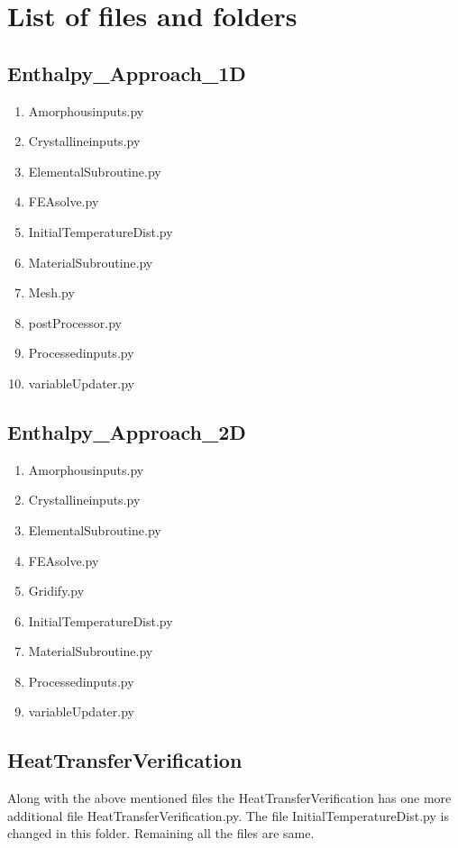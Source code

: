 \section{List of files and folders}
\subsection{Enthalpy\_Approach\_1D}
\begin{enumerate}
    \item Amorphous\textunderscore inputs.py
    \item Crystalline\textunderscore inputs.py
    \item Elemental\textunderscore Subroutine.py
    \item FEA\textunderscore solve.py
    \item Initial\textunderscore Temperature\textunderscore Dist.py
    \item Material\textunderscore Subroutine.py
    \item Mesh.py
    \item postProcessor.py
    \item Processed\textunderscore inputs.py
    \item variableUpdater.py
\end{enumerate}
\subsection{Enthalpy\_Approach\_2D}
\begin{enumerate}
    \item Amorphous\textunderscore inputs.py
    \item Crystalline\textunderscore inputs.py
    \item Elemental\textunderscore Subroutine.py
    \item FEA\textunderscore solve.py
    \item Gridify.py
    \item Initial\textunderscore Temperature\textunderscore Dist.py
    \item Material\textunderscore Subroutine.py
    \item Processed\textunderscore inputs.py
    \item variableUpdater.py
\end{enumerate}
\subsection{Heat\textunderscore Transfer\textunderscore Verification}
Along with the above mentioned files the Heat\textunderscore Transfer\textunderscore Verification has one more additional file Heat\textunderscore Transfer\textunderscore Verification.py. The file Initial\textunderscore Temperature\textunderscore Dist.py is changed in this folder. Remaining all the files are same. 
